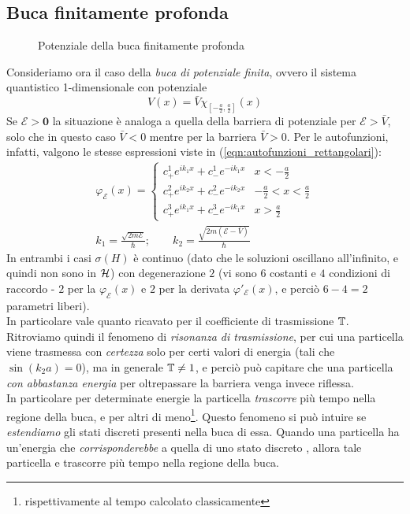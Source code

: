 \documentclass[../../FisicaTeorica.tex]{subfiles}
\begin{document}
\subsection{Buca finitamente profonda}
\begin{figure}[H]
\centering

\caption{Potenziale della buca finitamente profonda}
\end{figure}

Consideriamo ora il caso della \textit{buca di potenziale finita}, ovvero il sistema quantistico 1-dimensionale con potenziale
\[
V(x)=\bar{V}\chi_{\left[-\frac{a}{2},\frac{a}{2}\right]}(x)
\]
Se $\bm{\mathcal{E}>0}$ la situazione è analoga a quella della barriera di potenziale per $\mathcal{E}>\bar{V}$, solo che in questo caso $\bar{V}<0$ mentre per la barriera $\bar{V}>0$. Per le autofunzioni, infatti, valgono le stesse espressioni viste in (\ref{eqn:autofunzioni_rettangolari}):
\begin{align*}
\varphi_\mathcal{E}(x) = \begin{cases}
c^1_+ e^{ik_1 x} + c^1_- e^{-ik_1 x} & x < -\frac{a}{2}\\
c^2_+ e^{ik_2 x } + c^2_- e^{-ik_2 x} & -\frac{a}{2} < x < \frac{a}{2}\\
c^3_+ e^{ik_1x} + c^3_- e^{-ik_1 x} & x>\frac{a}{2}
\end{cases}\\
k_1 = \frac{\sqrt{2m\mathcal{E}}}{\hbar}; \qquad k_2 = \frac{\sqrt{2m(\mathcal{E}-\bar{V})}}{\hbar}
\end{align*}
 In entrambi i casi $\sigma(H)$ è continuo (dato che le soluzioni oscillano all'infinito, e quindi non sono in $\mathcal{H}$) con degenerazione $2$ (vi sono $6$ costanti e $4$ condizioni di raccordo - $2$ per la $\varphi_\mathcal{E}(x)$ e $2$ per la derivata $\varphi'_\mathcal{E}(x)$, e perciò $6-4=2$ parametri liberi).\\
In particolare vale quanto ricavato per il coefficiente di trasmissione $\mathbb{T}$. Ritroviamo quindi il fenomeno di \emph{risonanza di trasmissione}, per cui una particella viene trasmessa con \textit{certezza} solo per certi valori di energia (tali che $\sin(k_2 a )=0$), ma in generale $\mathbb{T}\neq 1$, e perciò può capitare che una particella \emph{con abbastanza energia} per oltrepassare la barriera venga invece riflessa.\\
In particolare per determinate energie la particella \emph{trascorre} più tempo nella regione della buca, e per altri di meno\footnote{rispettivamente al tempo calcolato classicamente}. Questo fenomeno si può intuire  se \textit{estendiamo} gli stati discreti presenti nella buca  di essa. Quando una particella ha un'energia che \textit{corrisponderebbe} a quella di uno stato discreto , allora tale particella  e trascorre più tempo nella regione della buca.\\
\end{document}
